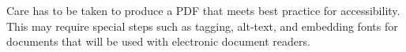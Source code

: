 Care has to be taken to produce a PDF that meets best practice for accessibility. This may require special steps such as tagging, alt-text, and embedding fonts for documents that will be used with electronic document readers.